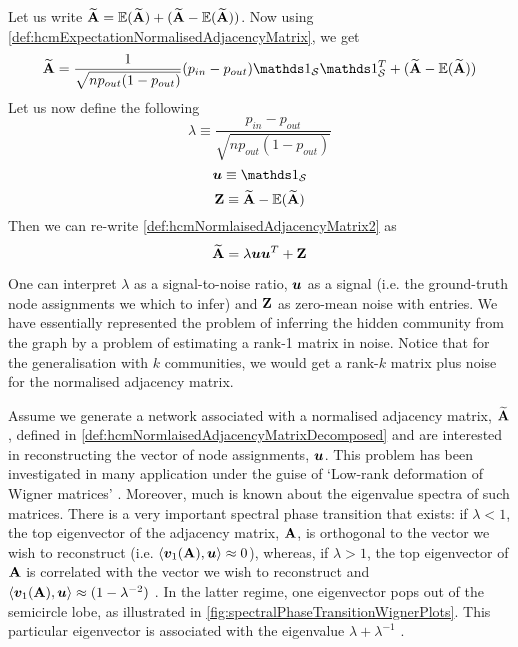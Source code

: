 Let us write $\widetilde{\mathbf A} = \mathbb{E}(\widetilde{\mathbf A}) + (\widetilde{\mathbf A} - \mathbb{E}(\widetilde{\mathbf A}))$. Now using \cref{def:hcmExpectationNormalisedAdjacencyMatrix}, we get
\begin{equation}
	\label{def:hcmNormlaisedAdjacencyMatrix2}
	\widetilde{\matvar{A}} = \frac{1}{\sqrt{np_{out}(1-p_{out})}} (p_{in} - p_{out}) \one_{\setvar{S}}\transpose{\one_{\setvar{S}}} + (\widetilde{\matvar{A}} - \expectation{\widetilde{\matvar{A}}})
\end{equation}
Let us now define the following
\begin{equation}
	\label{def:hcmLambda}
	\lambda \equiv \frac{p_{in} - p_{out}}{\sqrt{np_{out}(1-p_{out})}}
\end{equation}
\begin{equation}
	\label{def:hcmU}
	\vecvar{u} \equiv \one_{\setvar{S}}
\end{equation}
\begin{equation}
	\label{def:hcmZ}
	\mathbf Z \equiv \widetilde{\mathbf A} - \mathbb{E}(\widetilde{\mathbf A})
\end{equation}
Then we can re-write \cref{def:hcmNormlaisedAdjacencyMatrix2} as
\begin{equation}
	\label{def:hcmNormlaisedAdjacencyMatrixDecomposed}
	\widetilde{\matvar{A}} = \lambda \vecvar{u}\transpose{\vecvar{u}} + \matvar{Z}
\end{equation}

One can interpret $\lambda$ as a signal-to-noise ratio, $\vecvar{u}$ as a signal (i.e. the ground-truth node assignments we which to infer) and $\mathbf Z$ as zero-mean noise with \iid entries.
We have essentially represented the problem of inferring the hidden community from the graph by a problem of estimating a rank-1 matrix in noise. Notice that for the generalisation with $k$ communities, we would get a rank-$k$ matrix plus noise for the normalised adjacency matrix.

Assume we generate a network associated with a normalised adjacency matrix, $\widetilde{\mathbf A}$, defined in \cref{def:hcmNormlaisedAdjacencyMatrixDecomposed} and are interested in reconstructing the vector of node assignments, $\vecvar{u}$.
This problem has been investigated in many application under the guise of `Low-rank deformation of Wigner matrices' \cite{Mon13}.
Moreover, much is known about the eigenvalue spectra of such matrices. There is a very important spectral phase transition that exists: if $\lambda < 1$, the top eigenvector of the adjacency matrix, $\mathbf A$, is orthogonal to the vector we wish to reconstruct (i.e. $\innerP{\vecvar{v}_{1}(\matvar{A}),\vecvar{u} } \approx 0$), whereas, if $\lambda > 1$, the top eigenvector of $\mathbf A$ is correlated with the vector we wish to reconstruct and $\innerP{\vecvar{v}_{1}(\matvar{A}),\vecvar{u}} \approx (1 - \lambda^{-2})$ \cite{Mon13}.
In the latter regime, one eigenvector pops out of the semicircle lobe, as illustrated in \cref{fig:spectralPhaseTransitionWignerPlots}.
This particular eigenvector is associated with the eigenvalue $\lambda + \lambda^{-1}$ \cite{Mon13}.


